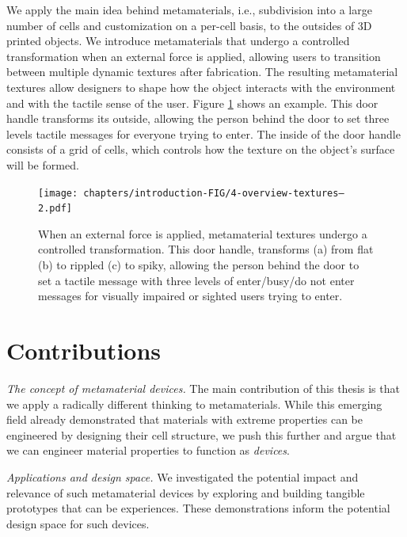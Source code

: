 We apply the main idea behind metamaterials, i.e., subdivision into a large number of cells and customization on a per-cell basis, to the outsides of 3D printed objects. We introduce metamaterials that undergo a controlled transformation when an external force is applied, allowing users to transition between multiple dynamic textures after fabrication. The resulting metamaterial textures allow designers to shape how the object interacts with the environment and with the tactile sense of the user. Figure \ref{fig:4-overview-textures} shows an example. This door handle transforms its outside, allowing the person behind the door to set three levels tactile messages for everyone trying to enter. The inside of the door handle consists of a grid of cells, which controls how the texture on the object's surface will be formed. 

\begin{figure} [h]
    \centering
    \texttt{[image: chapters/introduction-FIG/4-overview-textures--2.pdf]}
    \caption[Short figure name.]{When an external force is applied, metamaterial textures undergo a controlled transformation. This door handle, transforms (a) from flat (b) to rippled (c) to spiky, allowing the person behind the door to set a tactile message with three levels of enter/busy/do not enter messages for visually impaired or sighted users trying to enter.
    \label{fig:4-overview-textures}}
\end{figure}



\section{Contributions}

\textit{The concept of metamaterial devices.} \enspace The main contribution of this thesis is that we apply a radically different thinking to metamaterials. While this emerging field already demonstrated that materials with extreme properties can be engineered by designing their cell structure, we push this further and argue that we can engineer material properties to function as \textit{devices}. 

\textit{Applications and design space.} \enspace We investigated the potential impact and relevance of such metamaterial devices by exploring and building tangible prototypes that can be experiences. These demonstrations inform the potential design space for such devices.

